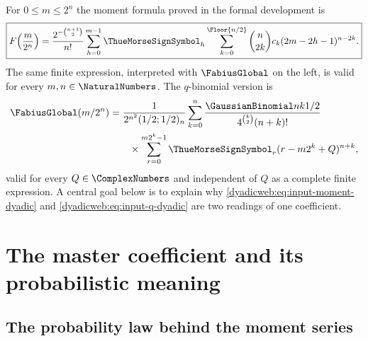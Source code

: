\documentclass[11pt,oneside]{article}
\theoremstyle{definition}
\theoremstyle{remark}
\begin{document}
For $0\le m\le2^n$ the moment formula proved in the formal development is
\begin{equation}
 \boxed{
 F\!\left(\frac{m}{2^n}\right)
 =\frac{2^{-\binom{n+1}{2}}}{n!}
 \sum_{h=0}^{m-1}\ThueMorseSignSymbol_h
 \sum_{k=0}^{\Floor{n/2}}
 \binom n{2k}c_k(2m-2h-1)^{n-2k}.}                        \label{dyadicweb:eq:input-moment-dyadic}
\end{equation}
The same finite expression, interpreted with $\FabiusGlobal$ on the left, is valid for every
$m,n\in\NaturalNumbers$.  The $q$-binomial version is
\begin{align}
 \FabiusGlobal(m/2^n)
 &=\frac{1}{2^{n^2}(1/2;1/2)_n}
 \sum_{k=0}^{n}
 \frac{\GaussianBinomial nk{1/2}}{4^{\binom k2}(n+k)!}             \notag\\
 &\qquad\times
 \sum_{r=0}^{m2^k-1}\ThueMorseSignSymbol_r(r-m2^k+Q)^{n+k},               \label{dyadicweb:eq:input-q-dyadic}
\end{align}
valid for every $Q\in\ComplexNumbers$ and independent of $Q$ as a complete finite expression.  A central
goal below is to explain why \eqref{dyadicweb:eq:input-moment-dyadic} and
\eqref{dyadicweb:eq:input-q-dyadic} are two readings of one coefficient.

\section{The master coefficient and its probabilistic meaning}
\label{dyadicweb:sec:master}

\subsection{The probability law behind the moment series}
\end{document}
